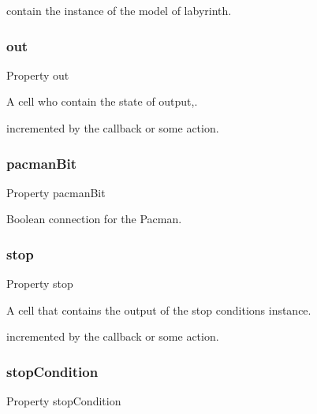 contain the instance of the model of labyrinth. 

\mbox{\label{class_wrapper_a8fcb5c64317d463be34f501200a2f49a}} 
\subsubsection{\texorpdfstring{out}{out}}
{\footnotesize\ttfamily Property out}



A cell who contain the state of output,. 

incremented by the callback or some action. \mbox{\label{class_wrapper_abf190bfcb1e7ec7573c4e002d30cb125}} 
\subsubsection{\texorpdfstring{pacman\+Bit}{pacmanBit}}
{\footnotesize\ttfamily Property pacman\+Bit}



Boolean connection for the Pacman. 

\mbox{\label{class_wrapper_ab453e11b3a41f7ef03be604bb5182e76}} 
\subsubsection{\texorpdfstring{stop}{stop}}
{\footnotesize\ttfamily Property stop}



A cell that contains the output of the stop conditions instance. 

incremented by the callback or some action. \mbox{\label{class_wrapper_a19a246dc459b20945f02106d6734fa4b}} 
\subsubsection{\texorpdfstring{stop\+Condition}{stopCondition}}
{\footnotesize\ttfamily Property stop\+Condition}



